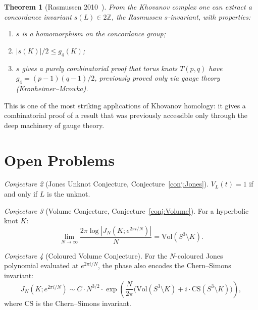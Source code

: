 \documentclass[12pt,a4paper]{amsart}
\newtheorem{theorem}{Theorem}[section]
\theoremstyle{definition}
\theoremstyle{remark}
\newtheorem{conjecture}[theorem]{Conjecture}
\newcommand{\Z}{\mathbb{Z}}
\begin{document}
\begin{theorem}[Rasmussen 2010~\cite{Rasmussen2010}]
From the Khovanov complex one can extract a concordance invariant
$s(L) \in 2\Z$, the \emph{Rasmussen $s$-invariant}, with properties:
\begin{enumerate}[label=\roman*)]
\item $s$ is a homomorphism on the concordance group;
\item $|s(K)|/2 \leq g_4(K)$;
\item $s$ gives a purely combinatorial proof that torus knots
      $T(p,q)$ have $g_4 = (p-1)(q-1)/2$, previously proved only
      via gauge theory (Kronheimer--Mrowka).
\end{enumerate}
\end{theorem}

This is one of the most striking applications of Khovanov homology:
it gives a combinatorial proof of a result that was previously accessible
only through the deep machinery of gauge theory.

\section{Open Problems}

\begin{conjecture}[Jones Unknot Conjecture, Conjecture~\ref{conj:Jones}]
$V_L(t) = 1$ if and only if $L$ is the unknot.
\end{conjecture}

\begin{conjecture}[Volume Conjecture, Conjecture~\ref{conj:Volume}]
For a hyperbolic knot $K$:
\[
    \lim_{N \to \infty} \frac{2\pi \log |J_N(K; e^{2\pi i/N})|}{N}
    = \mathrm{Vol}(S^3 \setminus K).
\]
\end{conjecture}

\begin{conjecture}[Coloured Volume Conjecture]
\label{conj:col-volume}
For the $N$-coloured Jones polynomial evaluated at $e^{2\pi i /N}$,
the phase also encodes the Chern--Simons invariant:
\[
    J_N(K; e^{2\pi i /N}) \sim C \cdot N^{3/2} \cdot \exp\left(
    \frac{N}{2\pi}\bigl(\mathrm{Vol}(S^3 \setminus K)
    + i \cdot \mathrm{CS}(S^3 \setminus K)\bigr) \right),
\]
where $\mathrm{CS}$ is the Chern--Simons invariant.
\end{conjecture}
\end{document}
